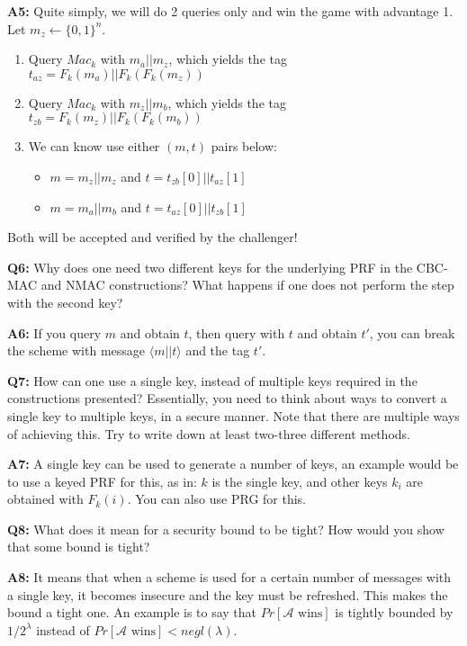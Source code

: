 \documentclass[12pt,reqno]{amsart}
\newcommand{\advrs}[0]{\mathcal{A}}
\begin{document}
\textbf{A5:} Quite simply, we will do 2 queries only and win the game with advantage 1. Let $m_z \xleftarrow{} \{0,1\}^n$.
\begin{enumerate}
	\item Query $Mac_k$ with $m_a || m_z$, which yields the tag $t_{az} = F_k(m_a) || F_k(F_k(m_z))$
	\item Query $Mac_k$ with $m_z || m_b$, which yields the tag $t_{zb} = F_k(m_z) || F_k(F_k(m_b))$
	\item We can know use either $(m, t)$ pairs below:
	\begin{itemize}
		\item $m = m_z || m_z$ and $t = t_{zb}[0] || t_{az}[1]$
		\item $m = m_a || m_b$ and $t = t_{az}[0] || t_{zb}[1]$
	\end{itemize}
\end{enumerate}
Both will be accepted and verified  by the challenger!

\vspace{20px}
\textbf{Q6:} Why does one need two different keys for the underlying PRF in the CBC-MAC and NMAC constructions? What happens if one does not perform the step with the second key?

\textbf{A6:} If you query $m$ and obtain $t$, then query with $t$ and obtain $t'$, you can break the scheme with message $\langle m || t\rangle$ and the tag $t'$.

\vspace{20px}
\textbf{Q7:} How can one use a single key, instead of multiple keys required in the constructions presented? Essentially, you need to think about ways to convert a single key to multiple keys, in a secure manner. Note that there are multiple ways of achieving this. Try to write down at least two-three different methods.

\textbf{A7:} A single key can be used to generate a number of keys, an example would be to use a keyed PRF for this, as in: $k$ is the single key, and other keys $k_i$ are obtained with $F_k(i)$. You can also use PRG for this.

\vspace{20px}
\textbf{Q8:} What does it mean for a security bound to be tight? How would you show that some bound is tight?

\textbf{A8:} It means that when a scheme is used for a certain number of messages with a single key, it becomes insecure and the key must be refreshed. This makes the bound a tight one. An example is to say that $Pr[\advrs \text{ wins}]$ is tightly bounded by $1/2^\lambda$ instead of $Pr[\advrs \text{ wins}] < negl(\lambda)$.
\end{document}

